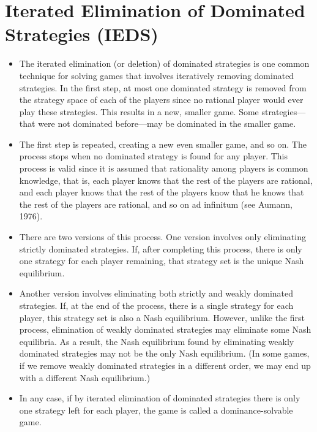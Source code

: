 \documentclass[]{report}
\begin{document}
\section{Iterated Elimination of Dominated Strategies (IEDS) }
\begin{itemize}
	\item The iterated elimination (or deletion) of dominated strategies is one common technique for solving games that involves iteratively removing dominated strategies. In the first step, at most one dominated strategy is removed from the strategy space of each of the players since no rational player would ever play these strategies. This results in a new, smaller game. Some strategies—that were not dominated before—may be dominated in the smaller game. 
	\item 
	The first step is repeated, creating a new even smaller game, and so on. The process stops when no dominated strategy is found for any player. This process is valid since it is assumed that rationality among players is common knowledge, that is, each player knows that the rest of the players are rational, and each player knows that the rest of the players know that he knows that the rest of the players are rational, and so on ad infinitum (see Aumann, 1976).
	\item 
	There are two versions of this process. One version involves only eliminating strictly dominated strategies. If, after completing this process, there is only one strategy for each player remaining, that strategy set is the unique Nash equilibrium.
	\item
	Another version involves eliminating both strictly and weakly dominated strategies. If, at the end of the process, there is a single strategy for each player, this strategy set is also a Nash equilibrium. However, unlike the first process, elimination of weakly dominated strategies may eliminate some Nash equilibria. As a result, the Nash equilibrium found by eliminating weakly dominated strategies may not be the only Nash equilibrium. (In some games, if we remove weakly dominated strategies in a different order, we may end up with a different Nash equilibrium.)
	\item 
	In any case, if by iterated elimination of dominated strategies there is only one strategy left for each player, the game is called a dominance-solvable game.
\end{itemize}
\newpage
\end{document}
